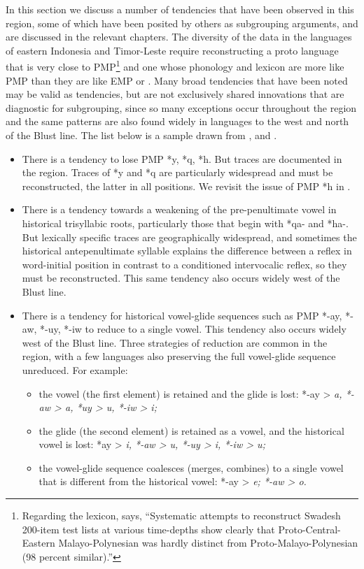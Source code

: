 In this section we discuss a number of tendencies that have been observed in this region,
some of which have been posited by others as subgrouping arguments,
and are discussed in the relevant chapters.
The diversity of the data in the  languages of eastern Indonesia
and Timor-Leste require reconstructing a proto language that is very close to PMP\footnote{
		Regarding the lexicon,
		\citet[245]{Blust1993} says,
		“Systematic attempts to reconstruct Swadesh 200-item test lists at
		various time-depths show clearly that Proto-Central-Eastern Malayo-Polynesian
		was hardly distinct from Proto-Malayo-Polynesian (98 percent similar).”}
and one whose phonology
and lexicon are more like PMP than they are like EMP or .
 Many broad tendencies that have been noted may be valid as tendencies,
but are not exclusively shared innovations that are diagnostic for subgrouping,
since so many exceptions occur throughout the region
and the same patterns are also found widely in languages to the west
and north of the Blust line.
The list below is a sample drawn from
\citet{Blust1993,Blust2013,DonohueGrimes2008,GrimesCIP}, and \citet{Schapper2015}.

\begin{itemize}
	\item There is a tendency to lose PMP *y, *q, *h.
				But traces are documented in the region.
				Traces of *y and *q are particularly widespread
				and must be reconstructed,
				the latter in all positions.
				We revisit the issue of PMP *h in .
	\item There is a tendency towards a weakening of the
				pre-penultimate vowel in historical trisyllabic roots,
				particularly those that begin with *qa- and *ha-.
				But lexically specific traces are geographically widespread,
				and sometimes the historical antepenultimate syllable explains
				the difference between a reflex in word-initial position
				in contrast to a conditioned intervocalic reflex,
				so they must be reconstructed.
				This same tendency also occurs widely west of the Blust line.
	\item There is a tendency for historical vowel-glide sequences
				such as PMP \mbox{*-ay}, *-aw, *-uy, *-iw to reduce to a single vowel.
				This tendency also occurs widely west of the Blust line.
				Three strategies of reduction are common in the region,
				with a few languages also preserving the full vowel-glide sequence unreduced.
				For example: 
	\begin{itemize}
		\item the vowel (the first element) is retained
					and the glide is lost:
					*-ay > \it{a}, *-aw > \it{a},
					*uy > \it{u}, *-iw > \it{i}; 
		\item the glide (the second element)
					is retained as a vowel,
					and the historical vowel is lost:
					*{\nbhyp}ay > \it{i}, *-aw > \it{u}, *-uy > \it{i}, *-iw > \it{u}; 
		\item the vowel-glide sequence coalesces (merges,
					combines) to a single vowel that is different from
					the historical vowel: *-ay > \it{e}; *-aw > \it{o}.
	\end{itemize}
\end{itemize}

